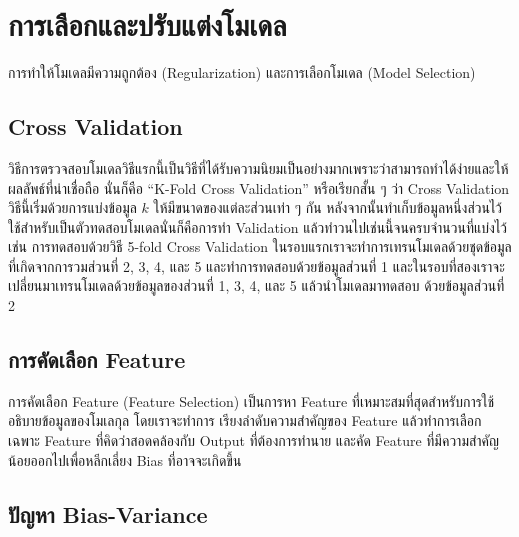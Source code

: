 

\chapter{การเลือกและปรับแต่งโมเดล}
\label{ch:reg_sel_model}

การทำให้โมเดลมีความถูกต้อง (Regularization) และการเลือกโมเดล (Model Selection)

\section{Cross Validation}

วิธีการตรวจสอบโมเดลวิธีแรกนี้เป็นวิธีที่ได้รับความนิยมเป็นอย่างมากเพราะว่าสามารถทำได้ง่ายและให้ผลลัพธ์ที่น่าเชื่อถือ นั่นก็คือ 
\enquote{K-Fold Cross Validation} หรือเรียกสั้น ๆ ว่า Cross Validation วิธีนี้เริ่มด้วยการแบ่งข้อมูล $k$ ให้มีขนาดของแต่ละส่วนเท่า ๆ กัน 
หลังจากนั้นทำเก็บข้อมูลหนึ่งส่วนไว้ใช้สำหรับเป็นตัวทดสอบโมเดลนั่นก็คือการทำ Validation แล้วทําวนไปเช่นนี้จนครบจํานวนที่แบ่งไว้ เช่น 
การทดสอบด้วยวิธี 5-fold Cross Validation ในรอบแรกเราจะทำการเทรนโมเดลด้วยชุดข้อมูลที่เกิดจากการวมส่วนที่ 2, 3, 4, และ 5 
และทำการทดสอบด้วยข้อมูลส่วนที่ 1 และในรอบที่สองเราจะเปลี่ยนมาเทรนโมเดลด้วยข้อมูลของส่วนที่ 1, 3, 4, และ 5 แล้วนำโมเดลมาทดสอบ%
ด้วยข้อมูลส่วนที่ 2

\section{การคัดเลือก Feature}

การคัดเลือก Feature (Feature Selection) เป็นการหา Feature ที่เหมาะสมที่สุดสำหรับการใช้อธิบายข้อมูลของโมเลกุล โดยเราจะทำการ%
เรียงลำดับความสำคัญของ Feature แล้วทำการเลือกเฉพาะ Feature ที่คิดว่าสอดคล้องกับ Output ที่ต้องการทำนาย และคัด Feature 
ที่มีความสำคัญน้อยออกไปเพื่อหลีกเลี่ยง Bias ที่อาจจะเกิดขึ้น

\section{ปัญหา Bias-Variance}

